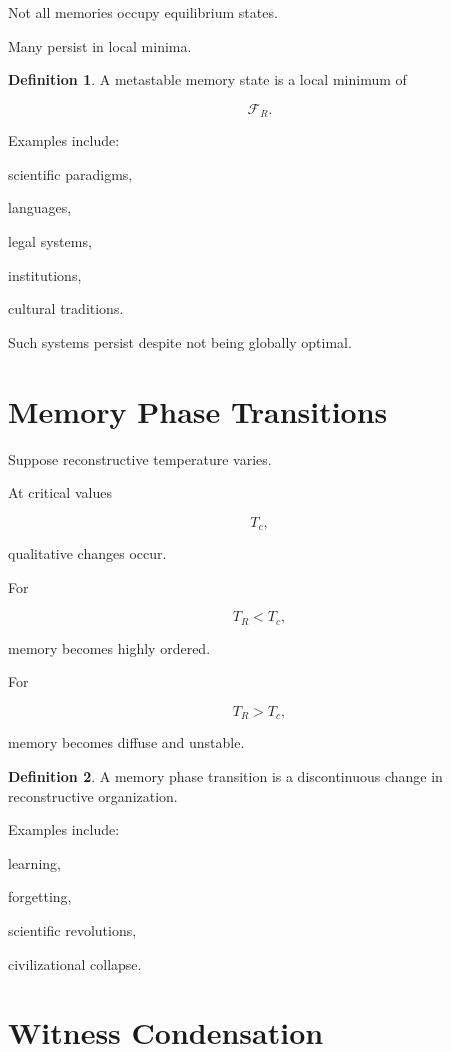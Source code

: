 \documentclass[12pt,oneside]{book}
\theoremstyle{plain} \newtheorem{theorem}{Theorem}[chapter] \newtheorem{lemma}[theorem]{Lemma} \newtheorem{proposition}[theorem]{Proposition} \newtheorem{corollary}[theorem]{Corollary}
\theoremstyle{definition} \newtheorem{definition}[theorem]{Definition} \newtheorem{axiom}[theorem]{Axiom} \newtheorem{construction}[theorem]{Construction}
\theoremstyle{remark} \newtheorem{remark}[theorem]{Remark} \newtheorem{example}[theorem]{Example}
\begin{document}
Not all memories occupy equilibrium states.

Many persist in local minima.

\begin{definition}

A metastable memory state is a local minimum of

\[
\mathcal F_R.
\]

\end{definition}

Examples include:

scientific paradigms,

languages,

legal systems,

institutions,

cultural traditions.

Such systems persist despite not being globally optimal.

\section{Memory Phase Transitions}

Suppose reconstructive temperature varies.

At critical values

\[
T_c,
\]

qualitative changes occur.

For

\[
T_R<T_c,
\]

memory becomes highly ordered.

For

\[
T_R>T_c,
\]

memory becomes diffuse and unstable.

\begin{definition}

A memory phase transition is a discontinuous change in reconstructive organization.

\end{definition}

Examples include:

learning,

forgetting,

scientific revolutions,

civilizational collapse.

\section{Witness Condensation}
\end{document}

